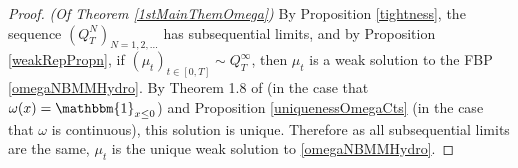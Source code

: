 \documentclass{article}
\newcommand{\is}{\mathbbm{1}}
\begin{document}
\begin{proof}\textit{(Of Theorem \ref{1stMainThemOmega})}
By Proposition \ref{tightness}, the sequence $(Q^N_T)_{N=1,2,\ldots}$ has subsequential limits, and by Proposition \ref{weakRepPropn}, if $(\mu_t)_{t\in [0,T]}\sim Q^\infty_T$, then $\mu_t$ is a weak solution to the FBP \eqref{omegaNBMMHydro}. By Theorem 1.8 of \cite{ettingerHeningEvans}  (in the case that $\omega(x)=\is_{x\leq 0}$) and Proposition \ref{uniquenessOmegaCts} (in the case that $\omega$ is continuous), this solution is unique. Therefore as all subsequential limits are the same, $\mu_t$ is the unique weak solution to \eqref{omegaNBMMHydro}.
\end{proof}



\end{document}

